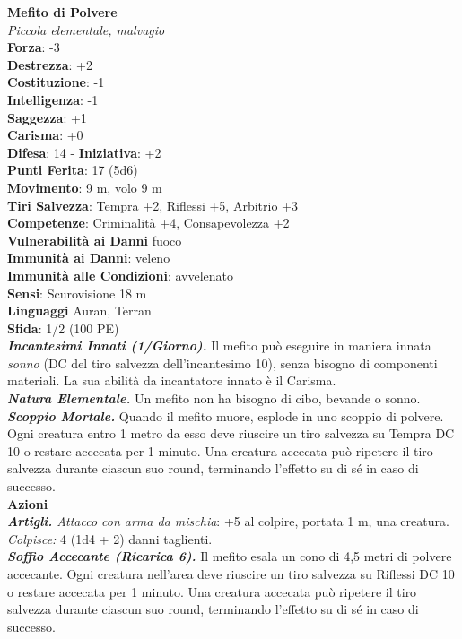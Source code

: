 \begin{multicols}{2}
\medskip\textbf{Mefito di Polvere}\\
\emph{Piccola elementale, malvagio}\\
\textbf{Forza}: -3\\
\textbf{Destrezza}: +2\\
\textbf{Costituzione}: -1\\
\textbf{Intelligenza}: -1\\
\textbf{Saggezza}: +1\\
\textbf{Carisma}: +0\\
\textbf{Difesa}: 14 - \textbf{Iniziativa}: +2\\
\textbf{Punti Ferita}: 17 (5d6)\\
\textbf{Movimento}: 9 m, volo 9 m\\
\textbf{Tiri Salvezza}: Tempra +2, Riflessi +5, Arbitrio +3\\
\textbf{Competenze}: Criminalità +4, Consapevolezza +2\\
\textbf{Vulnerabilità ai Danni} fuoco\\
\textbf{Immunità ai Danni}: veleno\\
\textbf{Immunità alle Condizioni}: avvelenato\\
\textbf{Sensi}: Scurovisione 18 m\\
\textbf{Linguaggi} Auran, Terran\\
\textbf{Sfida}: 1/2 (100 PE)\smallskip\\
\emph{\textbf{Incantesimi Innati (1/Giorno).}} Il mefito può eseguire in maniera innata \emph{sonno} (DC del tiro salvezza dell'incantesimo 10), senza bisogno di componenti materiali. La sua abilità da incantatore innato è il Carisma.\\
\emph{\textbf{Natura Elementale.}} Un mefito non ha bisogno di cibo, bevande o sonno.\\
\emph{\textbf{Scoppio Mortale.}} Quando il mefito muore, esplode in uno scoppio di polvere. Ogni creatura entro 1 metro da esso deve riuscire un tiro salvezza su Tempra DC 10 o restare accecata per 1 minuto. Una creatura accecata può ripetere il tiro salvezza durante ciascun suo round, terminando l'effetto su di sé in caso di successo. \\
\smallskip\textbf{Azioni}\\
\emph{\textbf{Artigli.} Attacco con arma da mischia}: +5 al colpire, portata 1 m, una creatura.\\
\emph{Colpisce:} 4 (1d4 + 2) danni taglienti.\\
\emph{\textbf{Soffio Accecante (Ricarica 6).}} Il mefito esala un cono di 4,5 metri di polvere accecante. Ogni creatura nell'area deve riuscire un tiro salvezza su Riflessi DC 10 o restare accecata per 1 minuto. Una creatura accecata può ripetere il tiro salvezza durante ciascun suo round, terminando l'effetto su di sé in caso di successo.\\

\end{multicols}
